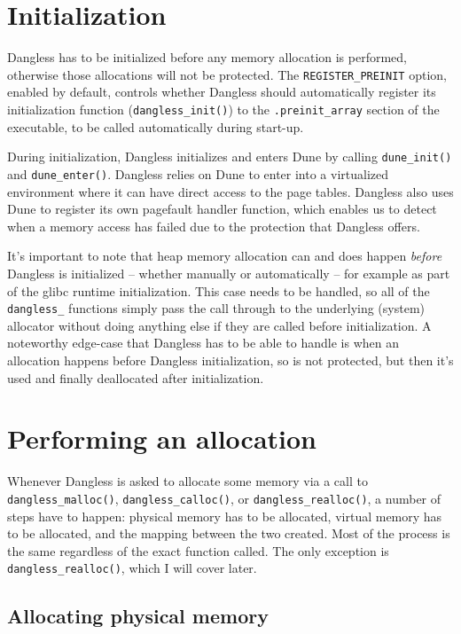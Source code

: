 \section{Initialization}
\label{sec:dangless-init}

Dangless has to be initialized before any memory allocation is performed, otherwise those allocations will not be protected. The \lstinline!REGISTER_PREINIT! option, enabled by default, controls whether Dangless should automatically register its initialization function (\lstinline!dangless_init()!) to the \lstinline!.preinit_array! section of the executable, to be called automatically during start-up.

During initialization, Dangless initializes and enters Dune by calling \lstinline!dune_init()! and \lstinline!dune_enter()!. Dangless relies on Dune to enter into a virtualized environment where it can have direct access to the page tables. Dangless also uses Dune to register its own pagefault handler function, which enables us to detect when a memory access has failed due to the protection that Dangless offers.

It's important to note that heap memory allocation can and does happen \emph{before} Dangless is initialized -- whether manually or automatically -- for example as part of the glibc runtime initialization. This case needs to be handled, so all of the \lstinline!dangless_! functions simply pass the call through to the underlying (system) allocator without doing anything else if they are called before initialization. A noteworthy edge-case that Dangless has to be able to handle is when an allocation happens before Dangless initialization, so is not protected, but then it's used and finally deallocated after initialization.

\section{Performing an allocation}

Whenever Dangless is asked to allocate some memory via a call to \lstinline!dangless_malloc()!, \lstinline!dangless_calloc()!, or \lstinline!dangless_realloc()!, a number of steps have to happen: physical memory has to be allocated, virtual memory has to be allocated, and the mapping between the two created. Most of the process is the same regardless of the exact function called. The only exception is \lstinline!dangless_realloc()!, which I will cover later.

\subsection{Allocating physical memory}

